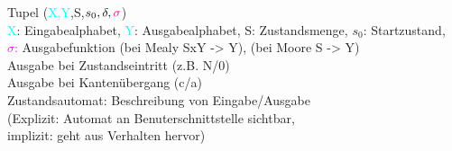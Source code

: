 Tupel (\textcolor{cyan}{X,Y},S,$s_0, \delta, \textcolor{magenta}{\sigma}$)\\
\textcolor{cyan}{X}: Eingabealphabet, \textcolor{cyan}{Y}: Ausgabealphabet, S: Zustandsmenge, $s_0$: Startzustand,\\ \textcolor{magenta}{$\sigma$:} Ausgabefunktion (bei Mealy SxY -> Y), (bei Moore S -> Y)\\
 Ausgabe bei Zustandseintritt (z.B. N/0) \\
 Ausgabe bei Kantenübergang (c/a)\\
Zustandsautomat: Beschreibung von Eingabe/Ausgabe \\
(Explizit: Automat an Benuterschnittstelle sichtbar, \\
implizit: geht aus Verhalten hervor)
